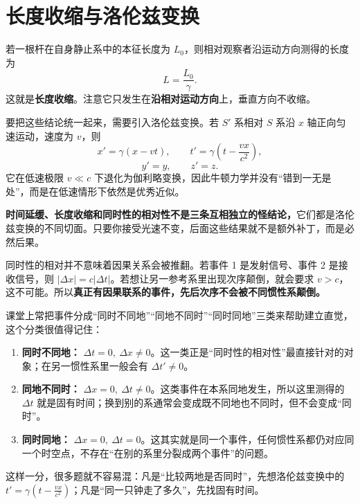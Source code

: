 \documentclass[lang=cn,11pt]{elegantbook}
\begin{document}
\section{长度收缩与洛伦兹变换}

若一根杆在自身静止系中的本征长度为 \(L_0\)，则相对观察者沿运动方向测得的长度为
\[
L=\frac{L_0}{\gamma}.
\]
这就是\textbf{长度收缩}。注意它只发生在\textbf{沿相对运动方向}上，垂直方向不收缩。

要把这些结论统一起来，需要引入洛伦兹变换。若 \(S'\) 系相对 \(S\) 系沿 \(x\) 轴正向匀速运动，速度为 \(v\)，则
\[
x'=\gamma(x-vt),\qquad
t'=\gamma\left(t-\frac{vx}{c^2}\right),
\]
\[
y'=y,\qquad z'=z.
\]
它在低速极限 \(v\ll c\) 下退化为伽利略变换，因此牛顿力学并没有“错到一无是处”，而是在低速情形下依然是优秀近似。

\begin{note}
\textbf{时间延缓、长度收缩和同时性的相对性不是三条互相独立的怪结论，}它们都是洛伦兹变换的不同切面。只要你接受光速不变，后面这些结果就不是额外补丁，而是必然后果。
\end{note}

\begin{remark}
同时性的相对并不意味着因果关系会被推翻。若事件 1 是发射信号、事件 2 是接收信号，则 \(|\Delta x|=c|\Delta t|\)。若想让另一参考系里出现次序颠倒，就会要求 \(v>c\)，这不可能。所以\textbf{真正有因果联系的事件，先后次序不会被不同惯性系颠倒。}
\end{remark}

\begin{remark}
课堂上常把事件分成“同时不同地”“同地不同时”“同时同地”三类来帮助建立直觉，这个分类很值得记住：
\begin{enumerate}
  \item \textbf{同时不同地：} \(\Delta t=0,\ \Delta x\neq 0\)。这一类正是“同时性的相对性”最直接针对的对象；在另一惯性系里一般会有 \(\Delta t'\neq 0\)。
  \item \textbf{同地不同时：} \(\Delta x=0,\ \Delta t\neq 0\)。这类事件在本系同地发生，所以这里测得的 \(\Delta t\) 就是固有时间；换到别的系通常会变成既不同地也不同时，但不会变成“同时”。
  \item \textbf{同时同地：} \(\Delta x=0,\ \Delta t=0\)。这其实就是同一个事件，任何惯性系都仍对应同一个时空点，不存在“在别的系里分裂成两个事件”的问题。
\end{enumerate}
这样一分，很多题就不容易混：凡是“比较两地是否同时”，先想洛伦兹变换中的 \(t'=\gamma\left(t-\frac{vx}{c^2}\right)\)；凡是“同一只钟走了多久”，先找固有时间。
\end{remark}
\end{document}
